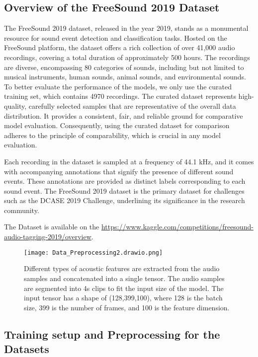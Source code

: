 \documentclass[runningheads]{llncs}
\begin{document}
\subsection{Overview of the FreeSound 2019 Dataset}
The FreeSound 2019 dataset, released in the year 2019, stands as a monumental resource for sound event detection and classification tasks. Hosted on the FreeSound platform, the dataset offers a rich collection of over 41,000 audio recordings, covering a total duration of approximately 500 hours. The recordings are diverse, encompassing 80 categories of sounds, including but not limited to musical instruments, human sounds, animal sounds, and environmental sounds. To better evaluate the performance of the models, we only use the curated training set, which contains 4970 recordings. The curated dataset represents high-quality, carefully selected samples that are representative of the overall data distribution. It provides a consistent, fair, and reliable ground for comparative model evaluation. Consequently, using the curated dataset for comparison adheres to the principle of comparability, which is crucial in any model evaluation.

Each recording in the dataset is sampled at a frequency of 44.1 kHz, and it comes with accompanying annotations that signify the presence of different sound events. These annotations are provided as distinct labels corresponding to each sound event. The FreeSound 2019 dataset is the primary dataset for challenges such as the DCASE 2019 Challenge,  underlining its significance in the research community. 

The Dataset is available on the \url{https://www.kaggle.com/competitions/freesound-audio-tagging-2019/overview}.


\begin{figure}
\centering
\texttt{[image: Data\_Preprocessing2.drawio.png]}
\caption{Different types of acoustic features are extracted from the audio samples and concatenated into a single tensor. The audio samples are segmented into 4s clips to fit the input size of the model. The input tensor has a shape of (128,399,100), where 128 is the batch size, 399 is the number of frames, and 100 is the feature dimension.} \label{fig5}
\end{figure}

\subsection{Training setup and Preprocessing for the Datasets}
\end{document}
